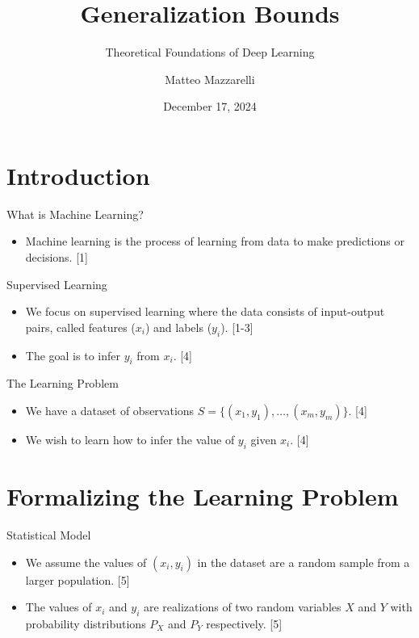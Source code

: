 \documentclass[
  ignorenonframetext,
]{beamer}
\title{Generalization Bounds}
\subtitle{Theoretical Foundations of Deep Learning}
\author{Matteo Mazzarelli}
\date{December 17, 2024}
\providecommand{\tightlist}{%
  \setlength{\itemsep}{0pt}\setlength{\parskip}{0pt}}\usepackage{longtable,booktabs,array}
\begin{document}
\frame{\titlepage}


\section{Introduction}\label{introduction}

\begin{frame}{What is Machine Learning?}
\label{what-is-machine-learning}
\begin{itemize}
\tightlist
\item
  Machine learning is the process of learning from data to make
  predictions or decisions. {[}1{]}
\end{itemize}
\end{frame}

\begin{frame}{Supervised Learning}
\label{supervised-learning}
\begin{itemize}
\tightlist
\item
  We focus on supervised learning where the data consists of
  input-output pairs, called features (\(x_i\)) and labels (\(y_i\)).
  {[}1-3{]}
\item
  The goal is to infer \(y_i\) from \(x_i\). {[}4{]}
\end{itemize}
\end{frame}

\begin{frame}{The Learning Problem}
\label{the-learning-problem}
\begin{itemize}
\tightlist
\item
  We have a dataset of observations
  \(S = \{(x_1, y_1), …, (x_m, y_m)\}\). {[}4{]}
\item
  We wish to learn how to infer the value of \(y_i\) given \(x_i\).
  {[}4{]}
\end{itemize}
\end{frame}

\section{Formalizing the Learning
Problem}\label{formalizing-the-learning-problem}

\begin{frame}{Statistical Model}
\label{statistical-model}
\begin{itemize}
\tightlist
\item
  We assume the values of \((x_i, y_i)\) in the dataset are a random
  sample from a larger population. {[}5{]}
\item
  The values of \(x_i\) and \(y_i\) are realizations of two random
  variables \(X\) and \(Y\) with probability distributions \(P_X\) and
  \(P_Y\) respectively. {[}5{]}
\end{itemize}
\end{frame}
\end{document}
